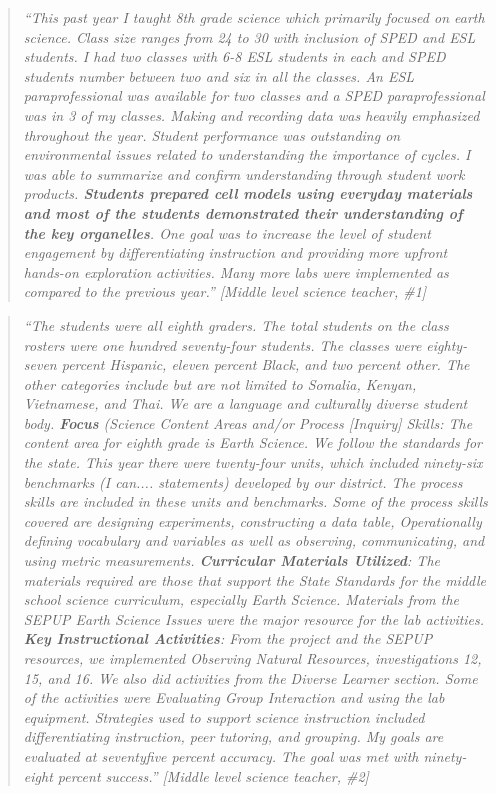\documentclass[11.5pt]{sig-alternate} %
\begin{document}
\begin{large}
\begin{quote}
    \textit{“This past year I taught 8th grade science which primarily focused on earth science. Class size ranges from 24 to 30 with inclusion of SPED and ESL students. I had two classes with 6-8 ESL students in each and SPED students number between two and six in all the classes. An ESL paraprofessional was available for two classes and a SPED paraprofessional was in 3 of my classes. Making and recording data was heavily emphasized throughout the year. Student performance was outstanding on environmental issues related to understanding the importance of cycles. I was able to summarize and confirm understanding through student work products. \textbf{Students prepared cell models using everyday materials and most of the students demonstrated their understanding of the key organelles}. One goal was to increase the level of student engagement by differentiating instruction and providing more upfront hands-on exploration activities. Many more labs were implemented as compared to the previous year.” [Middle level science teacher, \#1]}

\end{quote}

\begin{quote}
    \textit{“The students were all eighth graders. The total students on the class rosters were one hundred seventy-four students. The classes were eighty-seven percent Hispanic, eleven percent Black, and two percent other. The other categories include but are not limited to Somalia, Kenyan, Vietnamese, and Thai. We are a language and culturally diverse student body. \textbf{Focus} (Science Content Areas and/or Process [Inquiry] Skills: The content area for eighth grade is Earth Science. We follow the standards for the state. This year there were twenty-four units, which included ninety-six benchmarks (I can.... statements) developed by our district. The process skills are included in these units and benchmarks. Some of the process skills covered are designing experiments, constructing a data table, Operationally defining vocabulary and variables as well as observing, communicating, and using metric measurements. \textbf{Curricular Materials Utilized}: The materials required are those that support the State Standards for the middle school science curriculum, especially Earth Science. Materials from the SEPUP Earth Science Issues were the major resource for the lab activities. \textbf{Key Instructional Activities}: From the project and the SEPUP resources, we implemented Observing Natural Resources, investigations 12, 15, and 16. We also did activities from the Diverse Learner section. Some of the activities were Evaluating Group Interaction and using the lab equipment. Strategies used to support science instruction included differentiating instruction, peer tutoring, and grouping. My goals are evaluated at seventyfive percent accuracy. The goal was met with ninety-eight percent success.” [Middle level science teacher, \#2]}
\end{quote}


\end{large}
\end{document}
